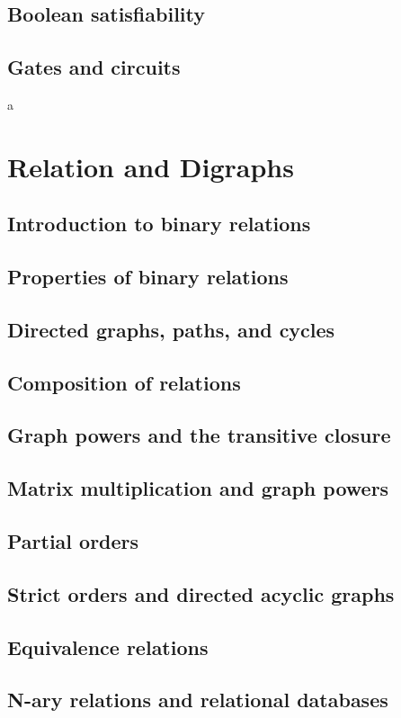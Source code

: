 \documentclass{article}
\begin{document}
\subsection{Boolean satisfiability}
\subsection{Gates and circuits}

a

\section{Relation and Digraphs}
\subsection{Introduction to binary relations}
\subsection{Properties of binary relations}
\subsection{Directed graphs, paths, and cycles}
\subsection{Composition of relations}
\subsection{Graph powers and the transitive closure}
\subsection{Matrix multiplication and graph powers}
\subsection{Partial orders}
\subsection{Strict orders and directed acyclic graphs}
\subsection{Equivalence relations}
\subsection{N-ary relations and relational databases}
\end{document}
